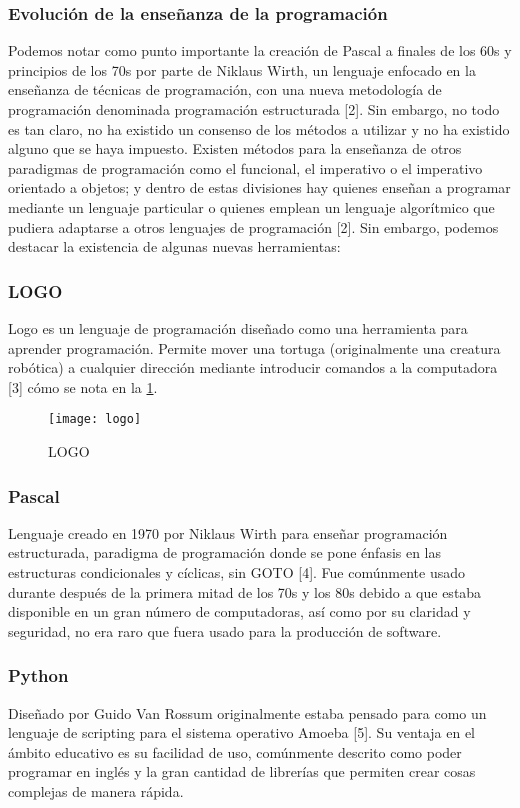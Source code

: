 \subsubsection{Evolución de la enseñanza de la programación}
Podemos notar como punto importante la creación de Pascal a finales de los 60s y principios de los 70s por parte de Niklaus Wirth, un lenguaje enfocado en la enseñanza de técnicas de programación, con una nueva metodología de programación denominada programación estructurada [2]. Sin embargo, no todo es tan claro, no ha existido un consenso de los métodos a utilizar y no ha existido alguno que se haya impuesto. 
Existen métodos para la enseñanza de otros paradigmas de programación como el funcional, el imperativo o el imperativo orientado a objetos; y dentro de estas divisiones hay quienes enseñan a programar mediante un lenguaje particular o quienes emplean un lenguaje algorítmico que pudiera adaptarse a otros lenguajes de programación [2].
Sin embargo, podemos destacar la existencia de algunas nuevas herramientas:

\subsubsection{LOGO}
Logo es un lenguaje de programación diseñado como una herramienta para aprender programación. 
Permite mover una tortuga (originalmente una creatura robótica) a cualquier dirección 
mediante introducir comandos a la computadora [3] cómo se nota en la \ref{fig:logo_scrn}.

\begin{figure}[h]
    \caption{LOGO}
    \centering
    \texttt{[image: logo]}
    \label{fig:logo_scrn}
\end{figure}

\subsubsection{Pascal}
Lenguaje creado en 1970 por Niklaus Wirth para enseñar programación estructurada, 
paradigma de programación donde se pone énfasis en las 
estructuras condicionales y cíclicas, sin GOTO [4]. 
Fue comúnmente usado durante después de la primera mitad de los 70s y los 80s 
debido a que estaba disponible en un gran número de computadoras, 
así como por su claridad y seguridad, no era raro que fuera usado para la 
producción de software.

\subsubsection{Python}
Diseñado por Guido Van Rossum originalmente estaba pensado 
para como un lenguaje de scripting para el sistema operativo Amoeba [5]. 
Su ventaja en el ámbito educativo es su facilidad de uso, comúnmente descrito 
como poder programar en inglés y la gran cantidad de librerías que permiten 
crear cosas complejas de manera rápida.


